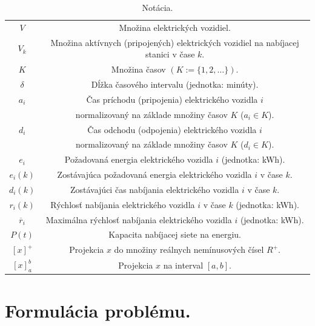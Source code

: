 \begin{table}[H]
    \begin{center}
        \begin{tabular}{ c c }
         $V$ & Množina elektrických vozidiel. \\ 
         $V_{k}$ & Množina aktívnych (pripojených) elektrických vozidiel na nabíjacej stanici v čase $k$.  \\  
         $K$ & Množina časov $\left(K:= \{1, 2, \dots\}\right)$. \\
         $\delta$ & Dĺžka časového intervalu (jednotka: minúty). \\
         $a_{i}$ & Čas príchodu (pripojenia) elektrického vozidla $i$ \\  & normalizovaný na základe množiny časov $K$ ($a_{i} \in K$). \\  
         $d_{i}$ & Čas odchodu (odpojenia) elektrického vozidla $i$ \\  & normalizovaný na základe množiny časov $K$ ($d_{i} \in K$). \\  
         $e_{i}$ & Požadovaná energia elektrického vozidla $i$ (jednotka: kWh).  \\ 
         $e_{i}(k)$ & Zostávajúca požadovaná energia elektrického vozidla $i$ v čase $k$.  \\
         $d_{i}(k)$ & Zostávajúci čas nabíjania elektrického vozidla $i$ v čase $k$. \\
         $r_{i}(k)$ & Rýchlosť nabíjania elektrického vozidla $i$ v čase $k$ (jednotka: kWh).   \\ 
         $\overline{r}_{i} $ & Maximálna rýchlosť nabíjania elektrického vozidla $i$ (jednotka: kWh). \\
         $P(t)$ & Kapacita nabíjacej siete na energiu. \\
         $[x]^{+}$ & Projekcia $x$ do množiny reálnych nemínusových čísel $R^{+}$.  \\
         $[x]_{a}^{b}$ & Projekcia $x$ na interval $[a, b]$. 
    
         
        \end{tabular}
        \caption{Notácia.}
        \label{tab:notation}
        \end{center}
    \end{table}


\section{Formulácia problému.}



